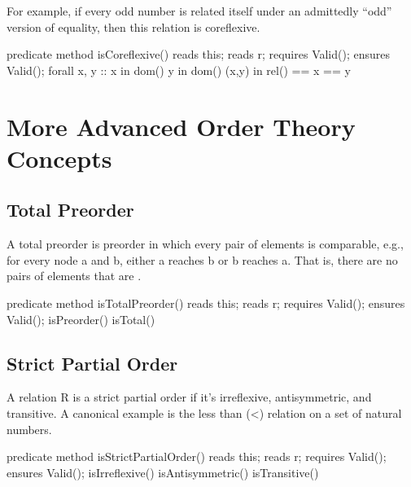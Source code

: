 \documentclass[letterpaper,10pt,english]{sphinxmanual}
\begin{document}
For example, if every odd number is related itself under an admittedly
“odd” version of equality, then this relation is coreflexive.

\begin{sphinxVerbatim}[commandchars=\\\{\}]
predicate method isCoreflexive()
    reads this;
    reads r;
    requires Valid();
    ensures Valid();
\PYGZob{}
    forall x, y :: x in dom() \PYGZam{}\PYGZam{} y in dom() \PYGZam{}\PYGZam{}
        (x,y) in rel() ==\PYGZgt{} x == y
\PYGZcb{}
\end{sphinxVerbatim}


\section{More Advanced Order Theory Concepts}
\label{\detokenize{08-relations:more-advanced-order-theory-concepts}}

\subsection{Total Preorder}
\label{\detokenize{08-relations:total-preorder}}
A total preorder is preorder in which every pair of elements is
comparable, e.g., for every node a and b, either a reaches b or b
reaches a.  That is, there are no pairs of elements that are
.

\begin{sphinxVerbatim}[commandchars=\\\{\}]
predicate method isTotalPreorder()
    reads this;
    reads r;
    requires Valid();
    ensures Valid();
    \PYGZob{}
        isPreorder() \PYGZam{}\PYGZam{} isTotal()
    \PYGZcb{}
\end{sphinxVerbatim}


\subsection{Strict Partial Order}
\label{\detokenize{08-relations:strict-partial-order}}
A relation R is a strict partial order if it’s irreflexive,
antisymmetric, and transitive. A canonical example is the less than
(\textless{}) relation on a set of natural numbers.

\begin{sphinxVerbatim}[commandchars=\\\{\}]
predicate method isStrictPartialOrder()
    reads this;
    reads r;
    requires Valid();
    ensures Valid();
\PYGZob{}
    isIrreflexive() \PYGZam{}\PYGZam{} isAntisymmetric() \PYGZam{}\PYGZam{} isTransitive()
\PYGZcb{}
\end{sphinxVerbatim}
\end{document}
